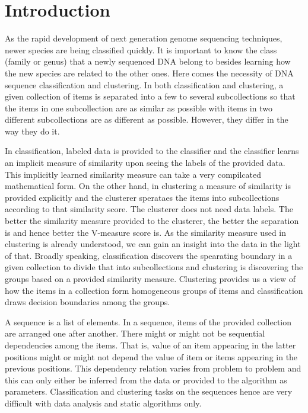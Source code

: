 \documentclass[oneside, twocolumn, a4paper, 10pt]{IEEEtran}
\begin{document}
\section{Introduction}
As the rapid development of next generation genome sequencing techniques, newer species are being classified quickly. It is important to know the class (family or genus) that a newly sequenced DNA belong to besides learning how the new species are related to the other ones. Here comes the necessity of DNA sequence classification and clustering. In both classification and clustering, a given collection of items is separated into a few to several subcollections so that the items in one subcollection are as similar as possible with items in two different subcollections are as different as possible. However, they differ in the way they do it.\\
\par
In classification, labeled data is provided to the classifier and the classifier learns an implicit measure of similarity upon seeing the labels of the provided data. This implicitly learned similarity measure can take a very compilcated mathematical form. On the other hand, in clustering a measure of similarity is provided explicitly and the clusterer sperataes the items into subcollections according to that similarity score. The clusterer does not need data labels. The better the similarity measure provided to the clusterer, the better the separation is and hence better the V-measure score is. As the similarity measure used in clustering is already understood, we can gain an insight into the data in the light of that. Broadly speaking, classification discovers the spearating boundary in a given collection to divide that into subcollections and clustering is discovering the groups based on a provided similarity measure. Clustering provides us a view of how the items in a collection form homogeneous groups of items and classification draws decision boundaries among the groups.\\
\par 
A sequence is a list of elements. In a sequence, items of the provided collection are arranged one after another. There might or might not be sequential dependencies among the items. That is, value of an item appearing in the latter positions might or might not depend the value of item or items appearing in the previous positions. This dependency relation varies from problem to problem and this can only either be inferred from the data or provided to the algorithm as parameters. Classification and clustering tasks on the sequences hence are very difficult with data analysis and static algorithms only.\\
\end{document}

